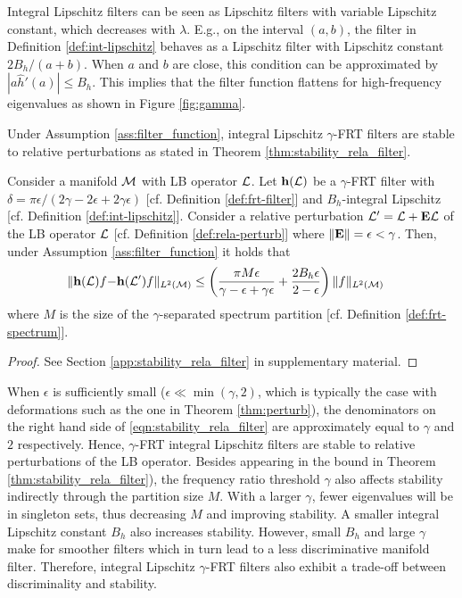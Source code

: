 Integral Lipschitz filters can be seen as Lipschitz filters with variable Lipschitz constant, which decreases with $\lambda$. E.g., on the interval $(a,b)$, the filter in Definition \ref{def:int-lipschitz} behaves as a Lipschitz filter with Lipschitz constant $2B_h/(a+b)$. When $a$ and $b$ are close, this condition can be approximated by $|a\hat{h}'(a)|\leq B_h$. This implies that the filter function flattens for high-frequency eigenvalues as shown in Figure \ref{fig:gamma}.

Under Assumption \ref{ass:filter_function}, integral Lipschitz $\gamma$-FRT filters are stable to relative perturbations as stated in Theorem \ref{thm:stability_rela_filter}.

\begin{theorem}\label{thm:stability_rela_filter}
Consider a manifold ${\mathcal M}$ with LB operator ${\mathcal L}$. Let ${\mathbf h}({\mathcal L})$ be a $\gamma$-FRT filter with $\delta=\pi\epsilon/(2\gamma-2\epsilon+2\gamma\epsilon)$ [cf. Definition \ref{def:frt-filter}] and $B_h$-integral Lipschitz [cf. Definition \ref{def:int-lipschitz}]. 
Consider a relative perturbation ${\mathcal L}'={\mathcal L} + {\mathbf E}{\mathcal L}$ of the LB operator ${\mathcal L}$ [cf. Definition \ref{def:rela-perturb}] where $\|{\mathbf E}\| = \epsilon < \gamma$. 
Then, under Assumption \ref{ass:filter_function} it holds that
 \begin{align}\label{eqn:stability_rela_filter}
 \|{\mathbf h}({\mathcal L})f-&{\mathbf h}({\mathcal L}')f\|_{L^2({\mathcal M})}   \leq  \left(\frac{\pi M\epsilon}{\gamma-\epsilon+\gamma\epsilon}+ \frac{2{B_h}\epsilon}{2-\epsilon} \right) \|f\|_{L^2({\mathcal M})} 
 \end{align}
where $M$ is the size of the $\gamma$-separated spectrum partition [cf. Definition \ref{def:frt-spectrum}].
\end{theorem}
\begin{proof}
See Section \ref{app:stability_rela_filter} in supplementary material.
\end{proof}

When $\epsilon$ is sufficiently small ($\epsilon \ll \min(\gamma,2)$, which is typically the case with deformations such as the one in Theorem \ref{thm:perturb}), the denominators on the right hand side of \eqref{eqn:stability_rela_filter} are approximately equal to $\gamma$ and $2$ respectively. Hence, $\gamma$-FRT integral Lipschitz filters are stable to relative perturbations of the LB operator.
Besides appearing in the bound in Theorem \ref{thm:stability_rela_filter}), the frequency ratio threshold $\gamma$ also affects stability indirectly through the partition size $M$. With a larger $\gamma$, fewer eigenvalues will be in singleton sets, thus decreasing $M$ and improving stability. A smaller integral Lipschitz constant $B_h$ also increases stability. However, small $B_h$ and large $\gamma$ make for smoother filters which in turn lead to a less discriminative manifold filter. Therefore, integral Lipschitz $\gamma$-FRT filters also exhibit a trade-off between discriminality and stability. 


